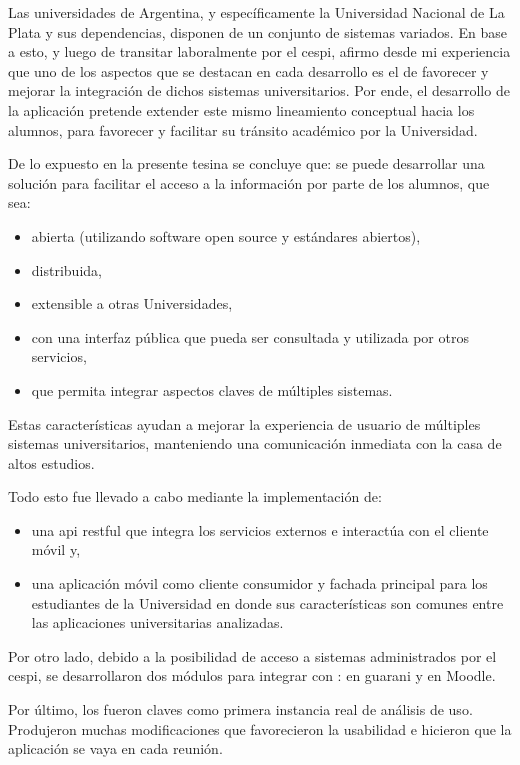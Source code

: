 
Las universidades de Argentina, y específicamente la Universidad Nacional de La Plata y sus dependencias, disponen de un conjunto de sistemas variados. En base a esto, y luego de transitar laboralmente por el \gls{cespi}, afirmo desde mi experiencia que uno de los aspectos que se destacan en cada desarrollo es el de favorecer y mejorar la integración de dichos sistemas universitarios. Por ende, el desarrollo de la aplicación \nombreApp{} pretende extender este mismo lineamiento conceptual hacia los alumnos, para favorecer y facilitar su tránsito académico por la Universidad.

De lo expuesto en la presente tesina se concluye que: se puede desarrollar una solución para facilitar el acceso a la información por parte de los alumnos, que sea:
\begin{itemize}
\item abierta (utilizando software \gls{open source} y estándares abiertos),
\item distribuida,
\item extensible a otras Universidades,
\item con una interfaz pública que pueda ser consultada y utilizada por otros servicios,
\item que permita integrar aspectos claves de múltiples sistemas.
\end{itemize}
Estas características ayudan a mejorar la experiencia de usuario de múltiples sistemas universitarios, manteniendo una comunicación inmediata con la casa de altos estudios.

Todo esto fue llevado a cabo mediante la implementación de: 
\begin{itemize}
\item una \gls{api} \gls{restful} que integra los servicios externos e interactúa con el cliente móvil y, 
\item una aplicación móvil como cliente consumidor y fachada principal para los estudiantes de la Universidad en donde sus características son comunes entre las aplicaciones universitarias analizadas.
\end{itemize}

Por otro lado, debido a la posibilidad de acceso a sistemas administrados por el \gls{cespi}, se desarrollaron dos módulos para integrar con \nombreApp{}: en \gls{guarani} y en Moodle.

Por último, los  fueron claves como primera instancia real de análisis de uso. Produjeron muchas modificaciones que favorecieron la usabilidad e hicieron que la aplicación se vaya  en cada reunión.

